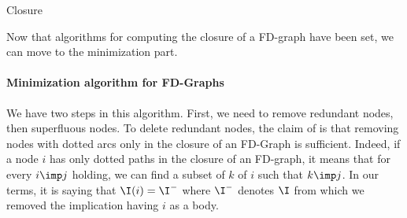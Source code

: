 \begin{algorithm}

\BlankLine
\BlankLine


\caption{Closure}
\label{alg:FD-Closure}
\end{algorithm}

\vspace{1.2em}

Now that algorithms for computing the closure of a FD-graph have been set, we
can move to the minimization part.

\paragraph{Minimization algorithm for FD-Graphs}

We have two steps in this algorithm. First, we need to remove redundant nodes, 
then superfluous nodes. To delete redundant nodes, the claim of 
\cite{ausiello_graph_1983, ausiello_minimal_1986} is that removing nodes with
dotted arcs only in the closure of an FD-Graph is sufficient. Indeed, if a node
$i$ has only dotted paths in the closure of an FD-graph, it means that for every
$i \imp j$ holding, we can find a subset of $k$ of $i$ such that $k \imp j$. In
our terms, it is saying that $\I(i) = \I^{-}$ where $\I^{-}$ denotes $\I$ from
which we removed the implication having $i$ as a body.


